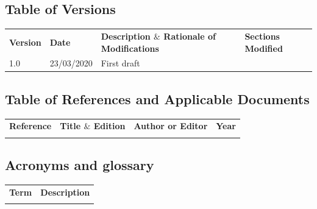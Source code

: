 \documentclass[12pt]{article}
\begin{document}
\subsection{Table of Versions}

\begin{table}[H]
\large
\centering
\begin{adjustbox}{width=\textwidth}
\begin{tabular}{ |p{1.5cm}|p{2.5cm}|p{9.0cm}|p{3.0cm}| }
\hhline{----}
\textbf{Version} & \textbf{Date} & \textbf{Description  $  \&  $  Rationale of
Modifications} & \textbf{Sections Modified} \\
\hhline{----}
1.0 & 23/03/2020 & First draft &  \\ 
\hline
\end{tabular}
\end{adjustbox}
\end{table}

\subsection{Table of References and Applicable Documents}

\begin{table}[H]
\large
\centering
\begin{adjustbox}{width=\textwidth}
\begin{tabular}{ |p{2.66in}|p{2.66in}|p{0.95in}|p{0.43in}| }
\hhline{----}
\textbf{Reference} & \textbf{Title  $  \&  $  Edition} & \textbf{Author or
Editor} & \textbf{Year}
\\
\hhline{----}
 &  &  &  \\ 
\hline
\end{tabular}
\end{adjustbox}
\end{table}

\subsection{Acronyms and glossary}

\begin{table}[H]
\large
\centering
\begin{adjustbox}{width=\textwidth}
\begin{tabular}{ |p{1.24in}|p{5.45in}| }
\hhline{--}
\textbf{Term} & \textbf{Description} \\ 
\hhline{--}
 &  \\ 
\hline
\end{tabular}
\end{adjustbox}
\end{table}
\end{document}
